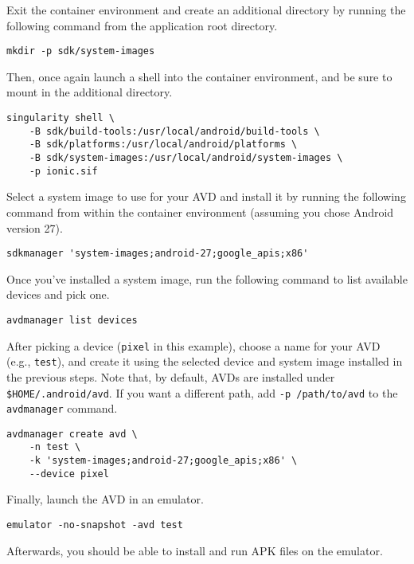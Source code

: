 \documentclass[12pt]{report}
\begin{document}
Exit the container environment and create an additional directory by running the
following command from the application root directory.

\begin{verbatim}
mkdir -p sdk/system-images
\end{verbatim}

Then, once again launch a shell into the container environment, and be sure to
mount in the additional directory.

\begin{verbatim}
singularity shell \
    -B sdk/build-tools:/usr/local/android/build-tools \
    -B sdk/platforms:/usr/local/android/platforms \
    -B sdk/system-images:/usr/local/android/system-images \
    -p ionic.sif
\end{verbatim}

Select a system image to use for your AVD and install it by running the
following command from within the container environment (assuming you chose
Android version 27).

\begin{verbatim}
sdkmanager 'system-images;android-27;google_apis;x86'
\end{verbatim}

Once you've installed a system image, run the following command to list
available devices and pick one.

\begin{verbatim}
avdmanager list devices
\end{verbatim}

After picking a device (\texttt{pixel} in this example), choose a name for your
AVD (e.g., \texttt{test}), and create it using the selected device and system
image installed in the previous steps. Note that, by default, AVDs are installed
under \texttt{\$HOME/.android/avd}. If you want a different path, add \texttt{-p
/path/to/avd} to the \texttt{avdmanager} command.

\begin{verbatim}
avdmanager create avd \
    -n test \
    -k 'system-images;android-27;google_apis;x86' \
    --device pixel
\end{verbatim}

Finally, launch the AVD in an emulator.

\begin{verbatim}
emulator -no-snapshot -avd test
\end{verbatim}

Afterwards, you should be able to install and run APK files on the emulator.
\end{document}
